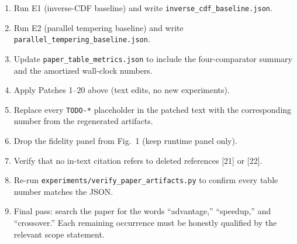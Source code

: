 \begin{enumerate}
\item Run E1 (inverse-CDF baseline) and write
      \verb|inverse_cdf_baseline.json|.
\item Run E2 (parallel tempering baseline) and write
      \verb|parallel_tempering_baseline.json|.
\item Update \verb|paper_table_metrics.json| to include the four-comparator
      summary and the amortized wall-clock numbers.
\item Apply Patches 1--20 above (text edits, no new experiments).
\item Replace every \verb|TODO-*| placeholder in the patched text with the
      corresponding number from the regenerated artifacts.
\item Drop the fidelity panel from Fig.~1 (keep runtime panel only).
\item Verify that no in-text citation refers to deleted references [21] or
      [22].
\item Re-run \verb|experiments/verify_paper_artifacts.py| to confirm every
      table number matches the JSON.
\item Final pass: search the paper for the words ``advantage,'' ``speedup,''
      and ``crossover.''  Each remaining occurrence must be honestly
      qualified by the relevant scope statement.
\end{enumerate}

